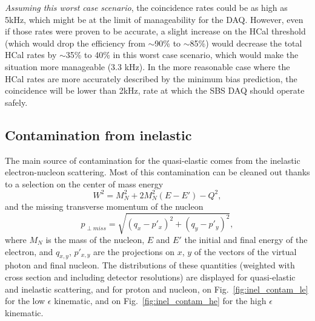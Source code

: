 {\em Assuming this worst case scenario}, the coincidence rates could be as high as 5kHz, which might be at the limit of manageability for the DAQ.
However, even if those rates were proven to be accurate, a slight increase on the HCal threshold (which would drop the efficiency from $\sim$90\% to $\sim$85\%) would decrease the total HCal rates by $\sim$35\% to 40\% in this worst case scenario, which would make the situation more manageable (3.3 kHz).
In the more reasonable case where the HCal rates are more accurately described by the minimum bias prediction, the coincidence will be lower than 2kHz, rate at which the SBS DAQ should operate safely.
  
  
\subsection{Contamination from inelastic}\label{sec:inel_contam}
The main source of contamination for the quasi-elastic comes from the inelastic electron-nucleon scattering. Most of this contamination can be cleaned out thanks to a selection on the center of mass energy
%
\begin{equation}
  W^2 = M_{N}^2+2M_{N}^{2}(E-E')-Q^2, %
\end{equation}
%
and the missing transverse momentum of the nucleon
%
\begin{equation}
  p_{\perp miss} = \sqrt{(q_{x}-p'_{x})^2+(q_{y}-p'_{y})^2},
\end{equation}
%
where $M_N$ is the mass of the nucleon, $E$ and $E'$ the initial and final energy of the electron, and $q_{x,y}$, $p'_{x, y}$ are the projections on $x$, $y$ of the vectors of the virtual photon and final nucleon.
The distributions of these quantities (weighted with cross section and including detector resolutions) are displayed for quasi-elastic and inelastic scattering, and for proton and nucleon, on Fig.~\ref{fig:inel_contam_le} for the low $\epsilon$ kinematic, and on Fig.~\ref{fig:inel_contam_he} for the high $\epsilon$ kinematic.\par
